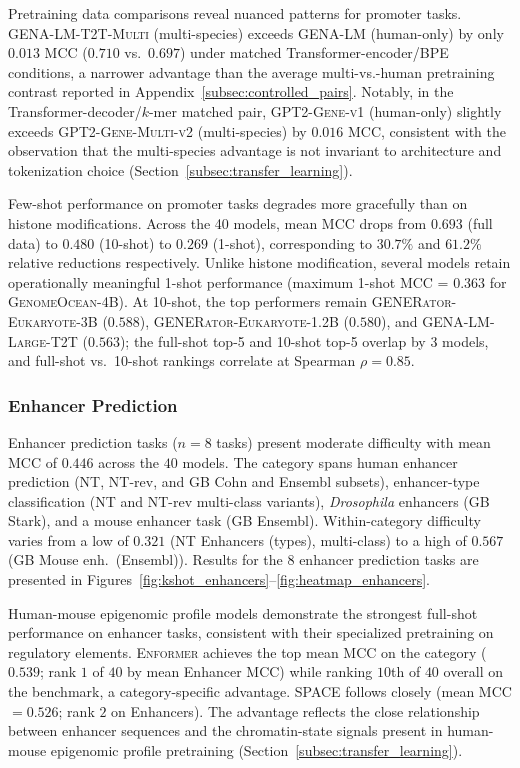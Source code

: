 \documentclass{llmxive}
\begin{document}
Pretraining data comparisons reveal nuanced patterns for promoter
tasks. \textsc{GENA-LM-T2T-Multi} (multi-species) exceeds
\textsc{GENA-LM} (human-only) by only $0.013$ MCC ($0.710$
vs.\ $0.697$) under matched Transformer-encoder/BPE conditions, a
narrower advantage than the average multi-vs.-human pretraining
contrast reported in
Appendix~\ref{subsec:controlled_pairs}. Notably, in the
Transformer-decoder/$k$-mer matched pair,
\textsc{GPT2-Gene-v1} (human-only) slightly exceeds
\textsc{GPT2-Gene-Multi-v2} (multi-species) by $0.016$ MCC,
consistent with the observation that the multi-species advantage
is not invariant to architecture and tokenization choice
(Section~\ref{subsec:transfer_learning}).

Few-shot performance on promoter tasks degrades more gracefully
than on histone modifications. Across the 40 models, mean MCC
drops from $0.693$ (full data) to $0.480$ (10-shot) to $0.269$
(1-shot), corresponding to $30.7\%$ and $61.2\%$ relative
reductions respectively. Unlike histone modification, several
models retain operationally meaningful 1-shot performance (maximum
1-shot MCC = $0.363$ for \textsc{GenomeOcean-4B}). At 10-shot, the
top performers remain \textsc{GENERator-Eukaryote-3B} ($0.588$),
\textsc{GENERator-Eukaryote-1.2B} ($0.580$), and
\textsc{GENA-LM-Large-T2T} ($0.563$); the full-shot top-5 and
10-shot top-5 overlap by 3 models, and full-shot vs.\ 10-shot
rankings correlate at Spearman $\rho = 0.85$.

\subsubsection{Enhancer Prediction}

Enhancer prediction tasks ($n=8$ tasks) present moderate difficulty
with mean MCC of $0.446$ across the $40$ models. The category
spans human enhancer prediction (NT, NT-rev, and GB Cohn and
Ensembl subsets), enhancer-type classification (NT and NT-rev
multi-class variants), \textit{Drosophila} enhancers (GB Stark),
and a mouse enhancer task (GB Ensembl). Within-category
difficulty varies from a low of $0.321$ (NT Enhancers (types),
multi-class) to a high of $0.567$ (GB Mouse enh.\ (Ensembl)).
Results for the 8 enhancer prediction tasks are presented in
Figures~\ref{fig:kshot_enhancers}--\ref{fig:heatmap_enhancers}.

Human-mouse epigenomic profile models demonstrate the strongest
full-shot performance on enhancer tasks, consistent with their
specialized pretraining on regulatory elements.
\textsc{Enformer} achieves the top mean MCC on the category
($0.539$; rank $1$ of $40$ by mean Enhancer MCC) while ranking
$10$th of $40$ overall on the benchmark, a category-specific
advantage. \textsc{SPACE} follows closely (mean MCC $= 0.526$;
rank $2$ on Enhancers). The advantage reflects the close
relationship between enhancer sequences and the chromatin-state
signals present in human-mouse epigenomic profile pretraining
(Section~\ref{subsec:transfer_learning}).
\end{document}
